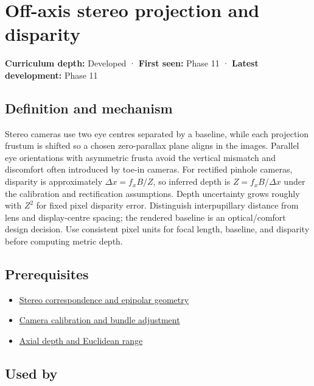 \hypertarget{appendix-0976e86e5b9f}{}\label{referencestart:appendix-0976e86e5b9f}
\section{Off-axis stereo projection and disparity}\label{appendix-0976e86e5b9f-off-axis-stereo-projection-and-disparity}

\textbf{Curriculum depth:} Developed · \textbf{First seen:} Phase 11 · \textbf{Latest development:} Phase 11

\subsection{Definition and mechanism}\label{appendix-0976e86e5b9f-definition-and-mechanism}

Stereo cameras use two eye centres separated by a baseline, while each projection frustum is shifted so a chosen zero-parallax plane aligns in the images. Parallel eye orientations with asymmetric frusta avoid the vertical mismatch and discomfort often introduced by toe-in cameras. For rectified pinhole cameras, disparity is approximately \(\Delta x=f_xB/Z\), so inferred depth is \(Z=f_xB/\Delta x\) under the calibration and rectification assumptions. Depth uncertainty grows roughly with \(Z^2\) for fixed pixel disparity error. Distinguish interpupillary distance from lens and display-centre spacing; the rendered baseline is an optical/comfort design decision. Use consistent pixel units for focal length, baseline, and disparity before computing metric depth.

\subsection{Prerequisites}\label{appendix-0976e86e5b9f-prerequisites}

\begin{itemize}
\tightlist
\item
  \hyperref[appendix-c4e98b6e4001]{Stereo correspondence and epipolar geometry}
\item
  \hyperref[appendix-3ee9861904d5]{Camera calibration and bundle adjustment}
\item
  \hyperref[appendix-cac01ebeeb11]{Axial depth and Euclidean range}
\end{itemize}

\subsection{Used by}\label{appendix-0976e86e5b9f-used-by}

